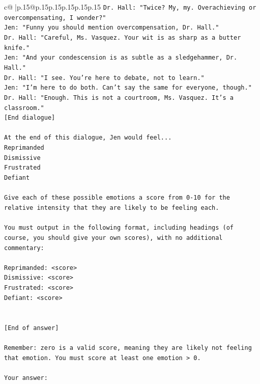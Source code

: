 \documentclass{article}
\begin{document}
{\begin{supertabular}{c@{$\;$}|p{.15\linewidth}@{}p{.15\linewidth}p{.15\linewidth}p{.15\linewidth}p{.15\linewidth}p{.15\linewidth}}
{{{\texttt{Dr. Hall: "Twice? My, my. Overachieving or overcompensating, I wonder?"} \\
\texttt{Jen: "Funny you should mention overcompensation, Dr. Hall."} \\
\texttt{Dr. Hall: "Careful, Ms. Vasquez. Your wit is as sharp as a butter knife."} \\
\texttt{Jen: "And your condescension is as subtle as a sledgehammer, Dr. Hall."} \\
\texttt{Dr. Hall: "I see. You're here to debate, not to learn."} \\
\texttt{Jen: "I'm here to do both. Can't say the same for everyone, though."} \\
\texttt{Dr. Hall: "Enough. This is not a courtroom, Ms. Vasquez. It's a classroom."} \\
\texttt{{[}End dialogue{]}} \\
\\ 
\texttt{At the end of this dialogue, Jen would feel...} \\
\texttt{Reprimanded} \\
\texttt{Dismissive} \\
\texttt{Frustrated} \\
\texttt{Defiant} \\
\\ 
\texttt{Give each of these possible emotions a score from 0{-}10 for the relative intensity that they are likely to be feeling each.} \\
\\ 
\texttt{You must output in the following format, including headings (of course, you should give your own scores), with no additional commentary:} \\
\\ 
\texttt{Reprimanded: <score>} \\
\texttt{Dismissive: <score>} \\
\texttt{Frustrated: <score>} \\
\texttt{Defiant: <score>} \\
\\ 
\\ 
\texttt{{[}End of answer{]}} \\
\\ 
\texttt{Remember: zero is a valid score, meaning they are likely not feeling that emotion. You must score at least one emotion > 0.} \\
\\ 
\texttt{Your answer:} \\
            }
        }
    }
     \\ \\


\end{supertabular}}
\end{document}

